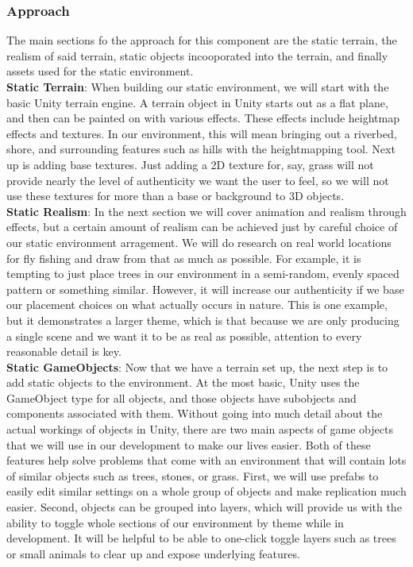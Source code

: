 \documentclass[10pt,journal,compsoc,onecolumn, draftclsnofoot]{IEEEtran}
\begin{document}
\subsubsection{Approach}
The main sections fo the approach for this component are the static terrain, the realism of said terrain, static objects incooporated into the terrain, and finally assets used for the static environment.\\

\hangindent=0.5cm \textbf{Static Terrain}: When building our static environment, we
will start with the basic Unity terrain engine. A terrain object in Unity starts out
as a flat plane, and then can be painted on with various
effects.\cite{unity_man_terrain} These effects include heightmap effects and
textures. In our environment, this will mean bringing out a riverbed, shore, and
surrounding features such as hills with the heightmapping tool. Next up is adding
base textures. Just adding a 2D texture for, say, grass will not provide nearly the
level of authenticity we want the user to feel, so we will not use these textures
for more than a base or background to 3D objects.\\

\hangindent=0.5cm \textbf{Static Realism}: In the next section we will cover
animation and realism through effects, but a certain amount of realism can be
achieved just by careful choice of our static environment arragement. We will do
research on real world locations for fly fishing and draw from that as much as
possible. For example, it is tempting to just place trees in our environment in a
semi-random, evenly spaced pattern or something similar. However, it will increase
our authenticity if we base our placement choices on what actually occurs in nature.
This is one example, but it demonstrates a larger theme, which is that because we
are only producing a single scene and we want it to be as real as possible,
attention to every reasonable detail is key.\\

\hangindent=0.5cm \textbf{Static GameObjects}: Now that we have a terrain set up,
the next step is to add static objects to the environment. At the most basic, Unity
uses the GameObject type for all objects, and those objects have subobjects and
components associated with them. \cite{ray} Without going into much detail about the
actual workings of objects in Unity, there are two main aspects of game objects that
we will use in our development to make our lives easier. Both of these features help
solve problems that come with an environment that will contain lots of similar
objects such as trees, stones, or grass. First, we will use prefabs to easily
edit similar settings on a whole group of objects and make replication much
easier. \cite{ray} Second, objects can be grouped into layers, which will
provide us with the ability to toggle whole sections of our environment by
theme while in development. \cite{layers_video} It will be helpful to be able
to one-click toggle layers such as trees or small animals to clear up and
expose underlying features.\\
\end{document}
